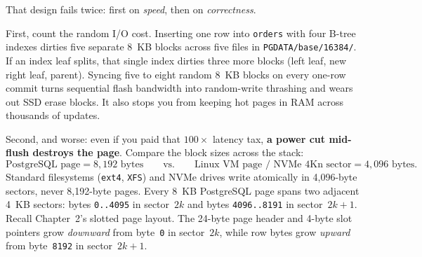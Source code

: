 That design fails twice: first on \emph{speed}, then on \emph{correctness}.

First, count the random I/O cost. Inserting one row into \texttt{orders} with four B-tree indexes dirties five separate 8~KB blocks across five files in \texttt{PGDATA/base/16384/}. If an index leaf splits, that single index dirties three more blocks (left leaf, new right leaf, parent). Syncing five to eight random 8~KB blocks on every one-row commit turns sequential flash bandwidth into random-write thrashing and wears out SSD erase blocks. It also stops you from keeping hot pages in RAM across thousands of updates.

Second, and worse: even if you paid that $100\times$ latency tax, \textbf{a power cut mid-flush destroys the page}. Compare the block sizes across the stack:
\[
  \text{PostgreSQL page} = 8{,}192\text{ bytes}
  \qquad\text{vs.}\qquad
  \text{Linux VM page / NVMe 4Kn sector} = 4{,}096\text{ bytes}.
\]
Standard filesystems (\texttt{ext4}, \texttt{XFS}) and NVMe drives write atomically in 4,096-byte sectors, never 8,192-byte pages. Every 8~KB PostgreSQL page spans two adjacent 4~KB sectors: bytes \texttt{0..4095} in sector~$2k$ and bytes \texttt{4096..8191} in sector~$2k+1$. Recall Chapter~2's slotted page layout. The 24-byte page header and 4-byte slot pointers grow \emph{downward} from byte~\texttt{0} in sector~$2k$, while row bytes grow \emph{upward} from byte~\texttt{8192} in sector~$2k+1$.

